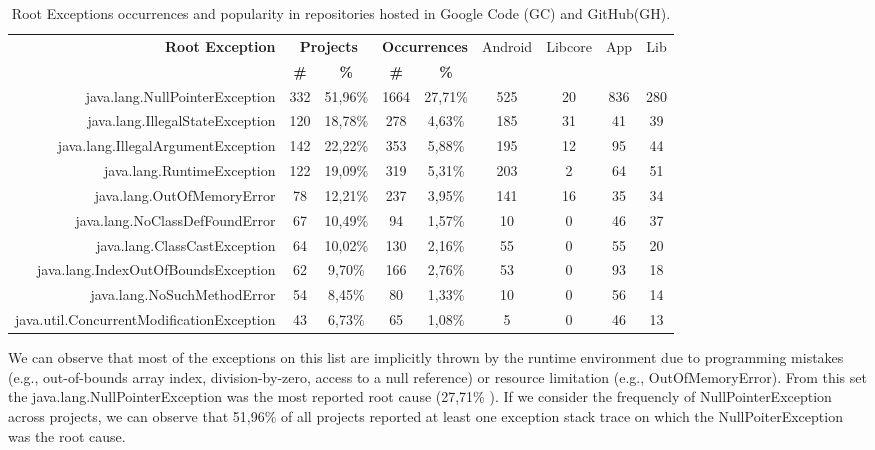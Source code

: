 \documentclass[conference]{IEEEtran}
\begin{document}
\begin{table}
  \centering
  \begin{tabular}{rcccccccc}
    \hline
    \bfseries{Root Exception} &  \multicolumn{2}{c}{\bfseries{Projects}} &  \multicolumn{2}{c}{\bfseries{Occurrences}} & \textsf{Android} & \textsf{Libcore} & \textsf{App} & \textsf{Lib} \\
    & \bfseries{\#} &  \bfseries{\%} & \bfseries{\# } & \bfseries{\% } &&&&\\
    \hline

java.lang.NullPointerException	&	332	&	51,96\%	&	1664	&	27,71\%	&	525	&	20	&	836	&	280	\\
java.lang.IllegalStateException	&	120	&	18,78\%	&	278	&	4,63\%	&	185	&	31	&	41	&	39	\\
java.lang.IllegalArgumentException	&	142	&	22,22\%	&	353	&	5,88\%	&	195	&	12	&	95	&	44	\\
java.lang.RuntimeException	&	122	&	19,09\%	&	319	&	5,31\%	&	203	&	2	&	64	&	51	\\
java.lang.OutOfMemoryError	&	78	&	12,21\%	&	237	&	3,95\%	&	141	&	16	&	35	&	34	\\
java.lang.NoClassDefFoundError	&	67	&	10,49\%	&	94	&	1,57\%	&	10	&	0	&	46	&	37	\\
java.lang.ClassCastException	&	64	&	10,02\%	&	130	&	2,16\%	&	55	&	0	&	55	&	20	\\
java.lang.IndexOutOfBoundsException	&	62	&	9,70\%	&	166	&	2,76\%	&	53	&	0	&	93	&	18	\\
java.lang.NoSuchMethodError	&	54	&	8,45\%	&	80	&	1,33\%	&	10	&	0	&	56	&	14	\\
java.util.ConcurrentModificationException	&	43	&	6,73\%	&	65	&	1,08\%	&	5	&	0	&	46	&	13	\\
    \hline
  \end{tabular}
\caption{Root Exceptions occurrences and popularity in repositories hosted in Google Code (GC) and GitHub(GH).}
\label{tab:topten}
\end{table}

 
We can observe that most of the exceptions on this list are implicitly thrown by the
 runtime environment due to programming mistakes  (e.g., out-of-bounds array index, division-by-zero, access to a null reference)
 or resource limitation (e.g., OutOfMemoryError). 
From this set the java.lang.NullPointerException was the most reported root cause (27,71\% ). 
If we consider the frequencly of NullPointerException 
across projects, we can observe that 51,96\% of all projects reported at least one exception stack 
trace on which the NullPoiterException was the root cause.
\end{document}
